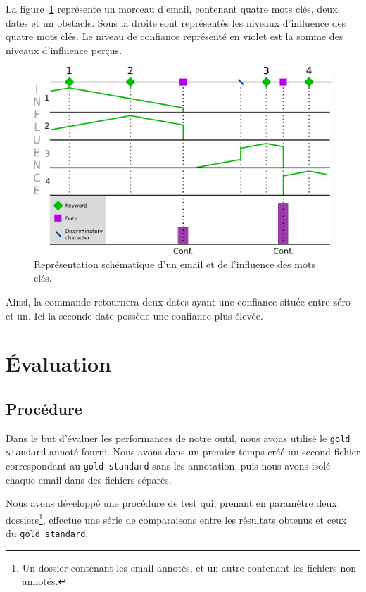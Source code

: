 \documentclass[a4paper,french,10pt]{article}
\begin{document}
La figure~\ref{fig:representation_email} représente un morceau d'email, contenant quatre mots clés, deux dates et un obstacle. Sous la droite sont représentés les niveaux d'influence des quatre mots clés. Le niveau de confiance représenté en violet est la somme des niveaux d'influence perçus.

\begin{figure}[H]
\includegraphics[width=\textwidth]{files/representation_email}
\caption{Représentation schématique d'un email et de l'influence des mots clés.}
\label{fig:representation_email}
\end{figure}

Ainsi, la commande retournera deux dates ayant une confiance située entre zéro et un. Ici la seconde date possède une confiance plus élevée.

\section{Évaluation}

\subsection{Procédure}

Dans le but d'évaluer les performances de notre outil, nous avons utilisé le \texttt{gold standard} annoté fourni. Nous avons dans un premier temps créé un second fichier correspondant au  \texttt{gold standard} sans les annotation, puis nous avons isolé chaque email dans des fichiers séparés.

Nous avons développé une procédure de test qui, prenant en paramètre deux dossiers\footnote{Un dossier contenant les email annotés, et un autre contenant les fichiers non annotés.}, effectue une série de comparaisons entre les résultats obtenus et ceux du \texttt{gold standard}.
\end{document}
